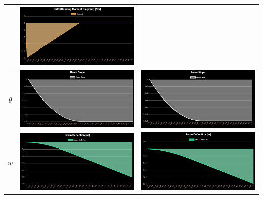 \documentclass{jsarticle}
\begin{document}
\begin{table}[H]
\begin{center}
\begin{tabular}{|c|c|c|}
\begin{minipage}{6truecm}
\end{minipage}
&
\begin{minipage}{6truecm}
\centering
\includegraphics[width=6cm]{cantilever_one_model_FDM_bm.PNG}
\end{minipage}
\\
\hline
$\theta$ &
\begin{minipage}{6truecm}
\centering
\includegraphics[width=6cm]{cantilever_one_model_FEM_slo.PNG}
\end{minipage}
&
\begin{minipage}{6truecm}
\centering
\includegraphics[width=6cm]{cantilever_one_model_FDM_slo.PNG}
\end{minipage}
\\
\hline
$w$ &
\begin{minipage}{6truecm}
\centering
\includegraphics[width=6cm]{cantilever_one_model_FEM_def.PNG}
\end{minipage}
&
\begin{minipage}{6truecm}
\centering
\includegraphics[width=6cm]{cantilever_one_model_FDM_def.PNG}
\end{minipage}
\\
\hline
\end{tabular}
\end{center}
\end{table}
\end{document}

